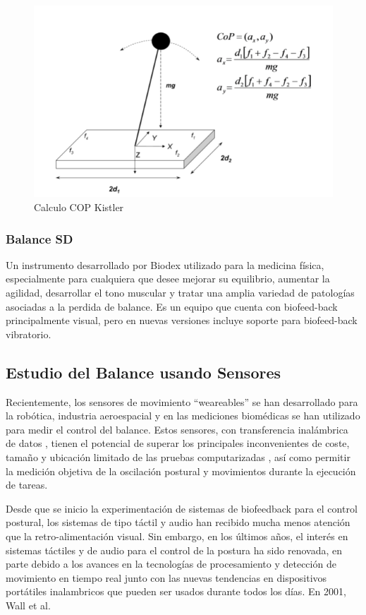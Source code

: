 \documentclass[12pt,a4paper]{article}
\begin{document}
\begin{figure}[H]
	\centering
	\includegraphics[width=0.65\linewidth]{images/Kistler}
	\caption{Calculo COP Kistler}
	\label{fig:Kistler}
\end{figure}

\subsubsection{Balance SD} Un instrumento desarrollado por Biodex \cite{Biodex} utilizado para la medicina física, especialmente para cualquiera que desee mejorar su equilibrio, aumentar la agilidad, desarrollar el tono muscular y tratar una amplia variedad de patologías asociadas a la perdida de balance.
Es un equipo que cuenta con biofeed-back principalmente visual, pero en nuevas versiones incluye soporte para biofeed-back vibratorio.


\subsection{Estudio del Balance usando Sensores}
Recientemente, los sensores de movimiento ``weareables'' se han desarrollado para la robótica, industria aeroespacial y en las mediciones biomédicas se han utilizado para medir el control del balance\cite{mancini_relevance_2010}. Estos sensores, con transferencia inalámbrica de datos , tienen el potencial de superar los principales inconvenientes de coste, tamaño y ubicación limitado de las pruebas computarizadas , así como permitir la medición objetiva de la oscilación postural y movimientos durante la ejecución de tareas.

Desde que se inicio la experimentación de sistemas de biofeedback para el control postural, los sistemas de tipo táctil y audio han recibido mucha menos atención que la retro-alimentación visual.
Sin embargo, en los últimos años, el interés en sistemas táctiles y de audio para el control de la postura ha sido renovada, en parte debido a los avances en la tecnologías de procesamiento y detección de movimiento en tiempo real junto con las nuevas tendencias en dispositivos portátiles inalambricos que pueden ser usados durante todos los días. 
En 2001, Wall et al. \cite{giansanti_energetic_2009} 
\end{document}
